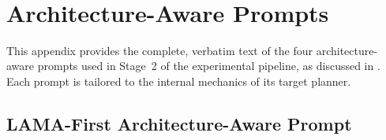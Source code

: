 \documentclass[
  numbers=noenddot,
  english,  %
  a4paper,  %
  oneside,  %
  bibliography=totoc,
  headsepline,
  cleardoublepage=empty,
  parskip=half,
  draft=false
]{scrbook}
\theoremstyle{break}
\begin{document}

\printbibliography

\ \\
%

\clearpage
\appendix
{}

\chapter{Architecture-Aware Prompts}\label{ch:appendix:prompts}

This appendix provides the complete, verbatim text of the four architecture-aware prompts used in Stage~2 of the experimental pipeline, as discussed in . Each prompt is tailored to the internal mechanics of its target planner.

\section{LAMA-First Architecture-Aware Prompt}
\end{document}

